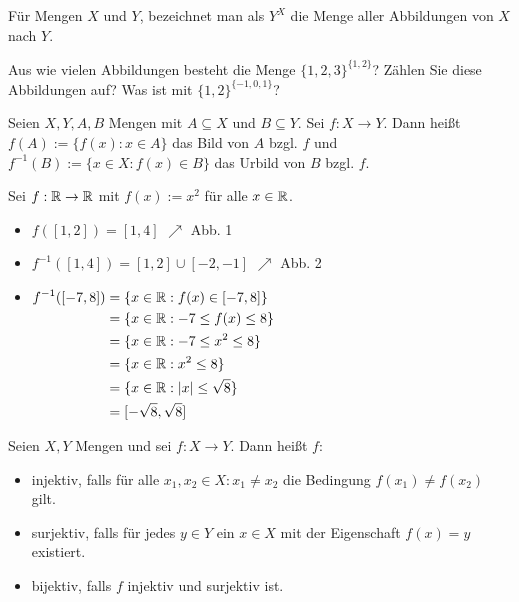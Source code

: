 \begin{bem} 
	Für Mengen $X$ und $Y$, 
	bezeichnet man als $ Y^X $  die Menge aller Abbildungen von $ X $ nach $ Y $.
\end{bem} 

\begin{aufg}
	Aus wie vielen Abbildungen besteht die Menge $\{1,2,3\}^{\{1,2\}}$? Zählen Sie diese Abbildungen auf? Was ist  mit $\{1,2\}^{\{-1,0,1\}}$?
\end{aufg} 

\begin{defn}
Seien $ X,Y,A,B $ Mengen mit $ A \subseteq X $ und $ B \subseteq Y $. Sei $ f : X \to Y $. Dann heißt $ f(A) := \{ f(x) : x \in A \} $ das Bild von $ A $ bzgl. $ f $ und $ f^{-1}(B) := \{ x \in X : f(x) \in B \} $ das Urbild von $ B $ bzgl. $ f $.
\end{defn} 

\begin{bsp}
	Sei $ f : \mathbb{R} \to \mathbb{R} $ mit $ f(x) := x^2 $ für alle $ x \in \mathbb{R} $.
	\begin{itemize}
		\item $ f( [1,2] ) = [1,4] $ $ \nearrow $ Abb. 1
		\item $ f^{-1}( [1,4] ) = [1,2] \cup [-2,-1] $ $ \nearrow $ Abb. 2
		\item
		$ \begin{aligned}[t]
			f^{-1}( [-7,8] ) &= \{ x \in \mathbb{R} : f(x) \in [-7,8] \} \\
			&= \{ x \in \mathbb{R} : -7 \leq f(x) \leq 8 \} \\
			&= \{ x \in \mathbb{R} : -7 \leq x^2 \leq 8 \} \\
			&= \{ x \in \mathbb{R} : x^2 \leq 8 \} \\
			&= \{ x \in \mathbb{R} : |x| \leq \sqrt{8} \} \\
			&= [-\sqrt{8},\sqrt{8}]
		\end{aligned} $
\end{itemize}
\end{bsp}


\begin{defn}
Seien $ X,Y $ Mengen und sei $ f : X \to Y $. Dann heißt $ f $:
\begin{itemize}
	\item injektiv, falls für alle $ x_1, x_2 \in X : x_1 \neq x_2 $ die Bedingung $ f(x_1) \neq f(x_2) $ gilt.
	\item surjektiv, falls für jedes $ y \in Y $ ein $ x \in X $ mit der Eigenschaft $ f(x) = y $ existiert.
	\item bijektiv, falls $ f $ injektiv und surjektiv ist.
\end{itemize}
\end{defn}

